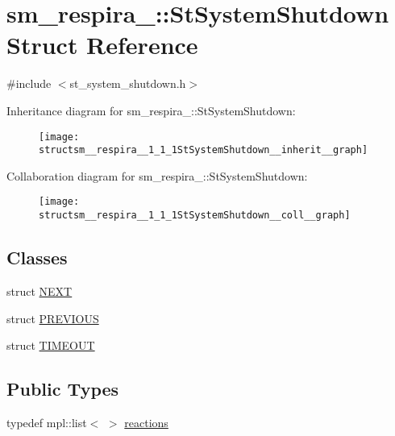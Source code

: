 \hypertarget{structsm__respira__1_1_1StSystemShutdown}{}\section{sm\+\_\+respira\+\_\+:\+:St\+System\+Shutdown Struct Reference}
\label{structsm__respira__1_1_1StSystemShutdown}


{\ttfamily \#include $<$st\+\_\+system\+\_\+shutdown.\+h$>$}



Inheritance diagram for sm\+\_\+respira\+\_\+:\+:St\+System\+Shutdown\+:
\nopagebreak
\begin{figure}[H]
\begin{center}
\leavevmode
\texttt{[image: structsm\_\_respira\_\_1\_1\_1StSystemShutdown\_\_inherit\_\_graph]}
\end{center}
\end{figure}


Collaboration diagram for sm\+\_\+respira\+\_\+:\+:St\+System\+Shutdown\+:
\nopagebreak
\begin{figure}[H]
\begin{center}
\leavevmode
\texttt{[image: structsm\_\_respira\_\_1\_1\_1StSystemShutdown\_\_coll\_\_graph]}
\end{center}
\end{figure}
\subsection*{Classes}
\begin{DoxyCompactItemize}
\item 
struct \hyperlink{structsm__respira__1_1_1StSystemShutdown_1_1NEXT}{N\+E\+XT}
\item 
struct \hyperlink{structsm__respira__1_1_1StSystemShutdown_1_1PREVIOUS}{P\+R\+E\+V\+I\+O\+US}
\item 
struct \hyperlink{structsm__respira__1_1_1StSystemShutdown_1_1TIMEOUT}{T\+I\+M\+E\+O\+UT}
\end{DoxyCompactItemize}
\subsection*{Public Types}
\begin{DoxyCompactItemize}
\item 
typedef mpl\+::list$<$ $>$ \hyperlink{structsm__respira__1_1_1StSystemShutdown_ae6fd4a2dbf4f3a8aa45f21074254a24e}{reactions}
\end{DoxyCompactItemize}
